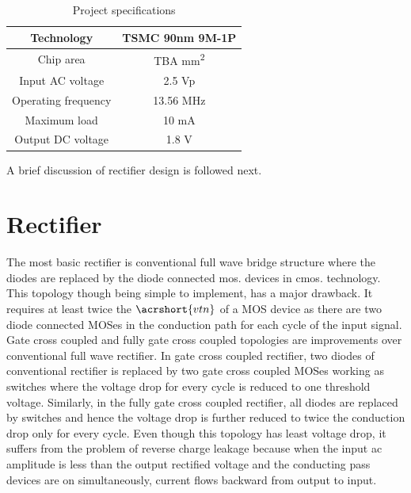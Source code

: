 \documentclass[12pt,a4paper,UKenglish]{article}
\begin{document}
\begin{table}[!htbp]
\caption{Project specifications}
\begin{center}
\begin{tabular}{c|c}
\hline \hline
Technology 		& TSMC 90nm 9M-1P\\ \hline
Chip area 			& TBA mm\textsuperscript{2} \\ \hline
Input AC voltage	& 2.5 Vp \\ \hline
Operating frequency & 13.56 MHz \\ \hline
Maximum load 		& 10 mA \\ \hline
Output DC voltage 	& 1.8 V \\ 
\hline \hline
\end{tabular}
\end{center}
\label{proj_spec}
\end{table}

A brief discussion of rectifier design is followed next.


\clearpage
\newpage

\section{Rectifier}
The most basic rectifier is conventional full wave bridge structure where the diodes are replaced by the diode connected \acrshort{mos}. devices in \acrshort{cmos}. technology. This topology though being simple to implement, has a major drawback. It requires at least twice the $\acrshort{vtn}$ of a MOS device as there are two diode connected MOSes in the conduction path for each cycle of the input signal.  \\

Gate cross coupled and fully gate cross coupled topologies are improvements over conventional full wave rectifier. In gate cross coupled rectifier, two diodes of conventional rectifier is replaced by two gate cross coupled MOSes working as switches where the voltage drop for every cycle is reduced to one threshold voltage. Similarly, in the fully gate cross coupled rectifier, all diodes are replaced by switches and hence the voltage drop is further reduced to twice the conduction drop only for every cycle. Even though this topology has least voltage drop, it suffers from the problem of reverse charge leakage because when the input ac amplitude is less than the output rectified voltage and the conducting pass devices are on simultaneously, current flows backward from output to input. \\
\end{document}
